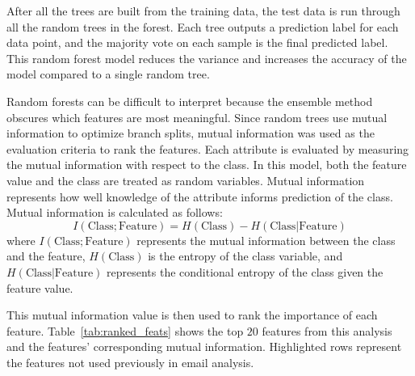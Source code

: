 \documentclass[10pt,twocolumn,conference]{IEEEtran}
\begin{document}
After all the trees are built from the training data, the test data is run through all the random trees in the forest.
Each tree outputs a prediction label for each data point, and the majority vote on each sample is the final predicted label.
This random forest model reduces the variance and increases the accuracy of the model compared to a single random tree.

Random forests can be difficult to interpret because the ensemble method obscures which features are most meaningful.
Since random trees use mutual information to optimize branch splits, mutual information was used as the evaluation criteria to rank the features.
Each attribute is evaluated by measuring the mutual information with respect to the class.
In this model, both the feature value and the class are treated as random variables.
Mutual information represents how well knowledge of the attribute informs prediction of the class.
Mutual information is calculated as follows:
\begin{equation}
I(\text{Class}; \text{Feature}) = H(\text{Class}) - H(\text{Class} | \text{Feature})
\end{equation} \label{eq:info_gained}
\hspace{-\parindent}
where $I(\text{Class}; \text{Feature})$ represents the mutual information between the class and the feature, $H(\text{Class})$ is the entropy of the class variable, and  $H(\text{Class} | \text{Feature})$ represents the conditional entropy of the class given the feature value.  

This mutual information value is then used to rank the importance of each feature.
Table~\ref{tab:ranked_feats} shows the top $20$ features from this analysis and the features' corresponding mutual information.
Highlighted rows represent the features not used previously in email analysis.
\end{document}
